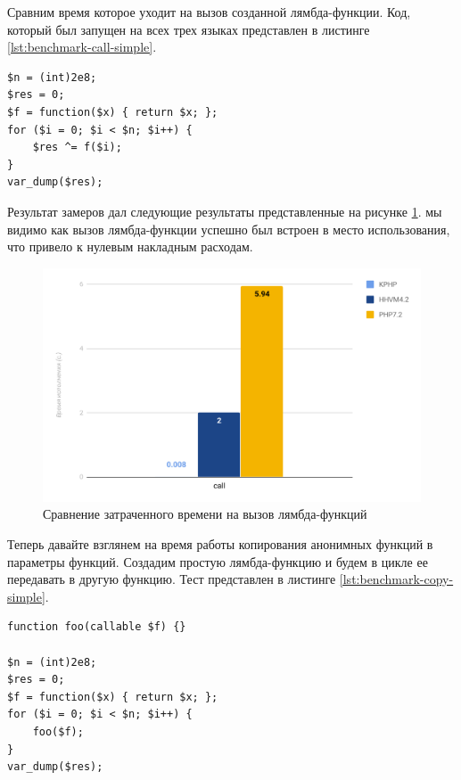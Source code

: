 Сравним время которое уходит на вызов созданной лямбда-функции.
Код, который был запущен на всех трех языках представлен в листинге \ref{lst:benchmark-call-simple}.
\begin{lstlisting}[caption={Бенчмарк вызовов анонимных функций},label={lst:benchmark-call-simple}]
$n = (int)2e8;
$res = 0;
$f = function($x) { return $x; };
for ($i = 0; $i < $n; $i++) {
    $res ^= f($i);
}
var_dump($res);
\end{lstlisting}

Результат замеров дал следующие результаты представленные на рисунке \ref{fig:benchmark-call-simple}.
мы видимо как вызов лямбда-функции успешно был встроен в место использования, что привело к нулевым накладным расходам.
\begin{figure}[H]
    \caption{Сравнение затраченного времени на вызов лямбда-функций}
    \label{fig:benchmark-call-simple}
    \centering
    \includegraphics[width=\linewidth]{images/benchmark_call_simple}
\end{figure}

Теперь давайте взглянем на время работы копирования анонимных функций в параметры функций.
Создадим простую лямбда-функцию и будем в цикле ее передавать в другую функцию.
Тест представлен в листинге \ref{lst:benchmark-copy-simple}.
\begin{lstlisting}[caption={Бенчмарк копирования анонимных функций},label={lst:benchmark-copy-simple}]
function foo(callable $f) {}

$n = (int)2e8;
$res = 0;
$f = function($x) { return $x; };
for ($i = 0; $i < $n; $i++) {
    foo($f);
}
var_dump($res);
\end{lstlisting}

